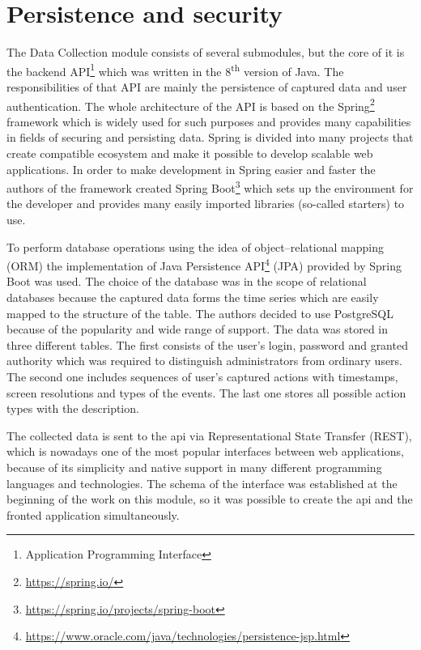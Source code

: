 \section{Persistence and security}\label{sec:persistence-and-security}
The Data Collection module consists of several submodules, but the core of it is the backend API\footnote{Application Programming Interface} which was written in the 8\textsuperscript{th} version of Java.
The responsibilities of that API are mainly the persistence of captured data and user authentication.
The whole architecture of the API is based on the Spring\footnote{\url{https://spring.io/}} framework which is widely used for such purposes and provides many capabilities in fields of securing and persisting data.
Spring is divided into many projects that create compatible ecosystem and make it possible to develop scalable web applications.
In order to make development in Spring easier and faster the authors of the framework created Spring Boot\footnote{\url{https://spring.io/projects/spring-boot}} which sets up the environment for the developer and provides many easily imported libraries (so-called starters) to use.

To perform database operations using the idea of object–relational mapping (ORM) the implementation of Java Persistence API\footnote{\url{https://www.oracle.com/java/technologies/persistence-jsp.html}} (JPA) provided by Spring Boot was used.
The choice of the database was in the scope of relational databases because the captured data forms the time series which are easily mapped to the structure of the table.
The authors decided to use PostgreSQL because of the popularity and wide range of support.
The data was stored in three different tables.
The first consists of the user's login, password and granted authority which was required to distinguish administrators from ordinary users.
The second one includes sequences of user's captured actions with timestamps, screen resolutions and types of the events.
The last one stores all possible action types with the description.

The collected data is sent to the \gls{api} via Representational State Transfer (REST), which is nowadays one of the most popular interfaces between web applications, because of its simplicity and native support in many different programming languages and technologies.
The schema of the interface was established at the beginning of the work on this module, so it was possible to create the \gls{api} and the fronted application simultaneously.

